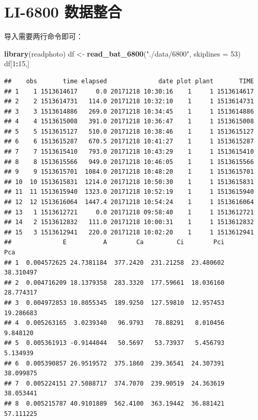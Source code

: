 \documentclass[]{krantz}
\makeatletter
\newenvironment{Shaded}{\begin{snugshade}}{\end{snugshade}}
\newcommand{\KeywordTok}[1]{\textcolor[rgb]{0.13,0.29,0.53}{\textbf{#1}}}
\newcommand{\DataTypeTok}[1]{\textcolor[rgb]{0.13,0.29,0.53}{#1}}
\newcommand{\DecValTok}[1]{\textcolor[rgb]{0.00,0.00,0.81}{#1}}
\newcommand{\StringTok}[1]{\textcolor[rgb]{0.31,0.60,0.02}{#1}}
\newcommand{\OperatorTok}[1]{\textcolor[rgb]{0.81,0.36,0.00}{\textbf{#1}}}
\newcommand{\NormalTok}[1]{#1}
\newenvironment{kframe}{%
\medskip{}
\setlength{\fboxsep}{.8em}
 \def\at@end@of@kframe{}%
 \ifinner\ifhmode%
  \def\at@end@of@kframe{\end{minipage}}%
  \begin{minipage}{\columnwidth}%
 \fi\fi%
 \def\FrameCommand##1{\hskip\@totalleftmargin \hskip-\fboxsep
 \colorbox{shadecolor}{##1}\hskip-\fboxsep
     \hskip-\linewidth \hskip-\@totalleftmargin \hskip\columnwidth}%
 \MakeFramed {\advance\hsize-\width
   \@totalleftmargin\z@ \linewidth\hsize
   \@setminipage}}%
 {\par\unskip\endMakeFramed%
 \at@end@of@kframe}
\renewenvironment{Shaded}{\begin{kframe}}{\end{kframe}}
\theoremstyle{definition}
\theoremstyle{definition}
\theoremstyle{definition}
\theoremstyle{remark}
\makeatother
\begin{document}
\section{LI-6800 数据整合}\label{batch68}

导入需要两行命令即可：

\begin{Shaded}
\begin{Highlighting}[]
\KeywordTok{library}\NormalTok{(readphoto)}
\NormalTok{df <-}\StringTok{ }\KeywordTok{read_bat_6800}\NormalTok{(}\StringTok{"./data/6800"}\NormalTok{, }\DataTypeTok{skiplines =} \DecValTok{53}\NormalTok{)}
\NormalTok{df[}\DecValTok{1}\OperatorTok{:}\DecValTok{15}\NormalTok{,]}
\end{Highlighting}
\end{Shaded}

\begin{verbatim}
##    obs       time elapsed              date plot plant       TIME
## 1    1 1513614617     0.0 20171218 10:30:16    1     1 1513614617
## 2    2 1513614731   114.0 20171218 10:32:10    1     1 1513614731
## 3    3 1513614886   269.0 20171218 10:34:45    1     1 1513614886
## 4    4 1513615008   391.0 20171218 10:36:47    1     1 1513615008
## 5    5 1513615127   510.0 20171218 10:38:46    1     1 1513615127
## 6    6 1513615287   670.5 20171218 10:41:27    1     1 1513615287
## 7    7 1513615410   793.0 20171218 10:43:29    1     1 1513615410
## 8    8 1513615566   949.0 20171218 10:46:05    1     1 1513615566
## 9    9 1513615701  1084.0 20171218 10:48:20    1     1 1513615701
## 10  10 1513615831  1214.0 20171218 10:50:30    1     1 1513615831
## 11  11 1513615940  1323.0 20171218 10:52:19    1     1 1513615940
## 12  12 1513616064  1447.4 20171218 10:54:24    1     1 1513616064
## 13   1 1513612721     0.0 20171218 09:58:40    1     1 1513612721
## 14   2 1513612832   111.0 20171218 10:00:31    1     1 1513612832
## 15   3 1513612941   220.0 20171218 10:02:20    1     1 1513612941
##              E          A        Ca         Ci        Pci        Pca
## 1  0.004572625 24.7381184  377.2420  231.21258  23.480602  38.310497
## 2  0.004716209 18.1379358  283.3320  177.59661  18.036160  28.774317
## 3  0.004972853 10.8055345  189.9250  127.59810  12.957453  19.286683
## 4  0.005263165  3.0239340   96.9793   78.88291   8.010456   9.848120
## 5  0.005361913 -0.9144044   50.5697   53.73937   5.456793   5.134939
## 6  0.005390857 26.9519572  375.1860  239.36541  24.307391  38.099875
## 7  0.005224151 27.5088717  374.7070  239.90519  24.363619  38.053441
## 8  0.005215787 40.9101889  562.4100  363.19442  36.881421  57.111225

\end{verbatim}
\end{document}
